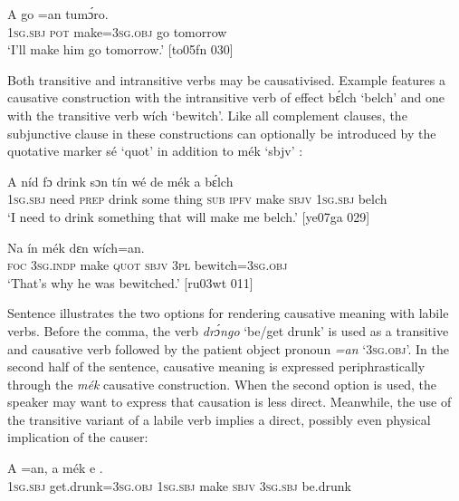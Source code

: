 \ea%
    \label{ex:key:1322}
    \gll A    go  =an        tumɔ́ro.\\
\textsc{1sg.sbj}  \textsc{pot}  make=\textsc{3sg.obj}    go  tomorrow\\

\glt ‘I’ll make him go tomorrow.’ [to05fn 030]
\z

Both transitive and intransitive verbs may be causativised. Example  features a causative construction with the intransitive verb of effect bɛ́lch ‘belch’ and  one with the transitive verb wích ‘bewitch’. Like all complement clauses, the subjunctive clause in these constructions can optionally be introduced by the quotative marker sé ‘quot’ in addition to mék ‘sbjv’ :


\ea%
    \label{ex:key:1323}
    \gll A    níd    fɔ  drink  sɔn    tín    wé  de  
mék    a    bɛ́lch\\
\textsc{1sg.sbj}  need  \textsc{prep}  drink  some  thing  \textsc{sub}  \textsc{ipfv}  make
\textsc{sbjv}    \textsc{1sg.sbj}  belch\\

\glt ‘I need to drink something that will make me belch.’ [ye07ga 029]
\z


\ea%
    \label{ex:key:1324}
    \gll Na  ín    mék            dɛn  wích=an.\\
\textsc{foc}  \textsc{3sg.indp}  make  \textsc{quot}    \textsc{sbjv}    \textsc{3pl}  bewitch=\textsc{3sg.obj}\\

\glt ‘That’s why he was bewitched.’ [ru03wt 011]
\z

Sentence  illustrates the two options for rendering causative meaning with labile verbs. Before the comma, the verb \textit{drɔ́ngo} ‘be/get drunk’ is used as a transitive and causative verb followed by the patient object pronoun \textit{=an} ‘\textsc{3sg.obj}’. In the second half of the sentence, causative meaning is expressed periphrastically through the \textit{mék} causative construction. When the second option is used, the speaker may want to express that causation is less direct. Meanwhile, the use of the transitive variant of a labile verb implies a direct, possibly even physical implication of the causer:


\ea%
    \label{ex:key:1325}
    \gll A    =an,    a        mék    e    .\\
\textsc{1sg.sbj}  get.drunk=\textsc{3sg.obj}  \textsc{1sg.sbj}  make  \textsc{sbjv}    \textsc{3sg.sbj}  be.drunk\\


